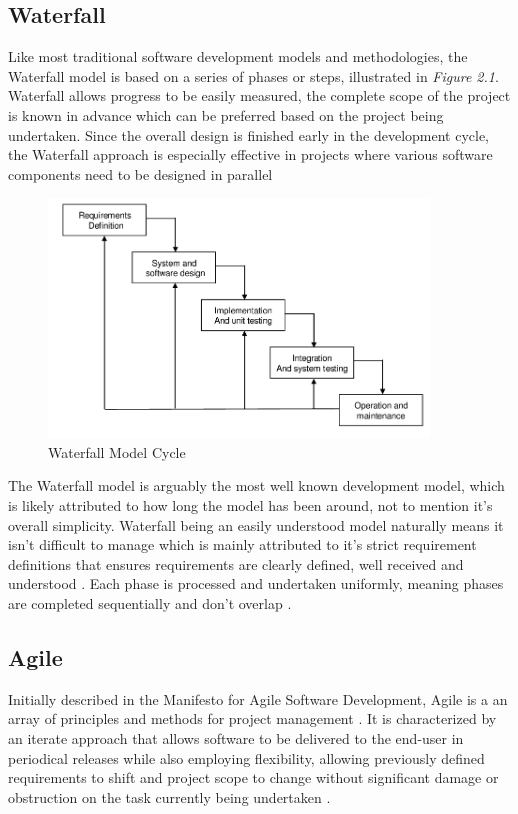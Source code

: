 \subsection{Waterfall}
Like most traditional software development models and methodologies, the Waterfall model is based on a series of phases or steps, illustrated in \textit{Figure 2.1}. Waterfall allows progress to be easily measured, the complete scope of the project is known in advance which can be preferred based on the project being undertaken. Since the overall design is finished early in the development cycle, the Waterfall approach is especially effective in projects where various software components need to be designed in parallel \cite{WATERFALL_SURVEY} 

\begin{figure}[H]
	\caption{Waterfall Model Cycle}
	\label{image:waterfall}
	\centering
	\includegraphics[width=0.9\textwidth]{images/waterfall.png}
\end{figure}	

The Waterfall model is arguably the most well known development model, which is likely attributed to how long the model has been around, not to mention it's overall simplicity. Waterfall being an easily understood model naturally means it isn't difficult to manage which is mainly attributed to it's strict requirement definitions that ensures requirements are clearly defined, well received and understood \cite{WATERFALL}. Each phase is processed and undertaken uniformly, meaning phases are completed sequentially and don't overlap \cite{WATERFALL_REVIEW}.

\subsection{Agile}
Initially described in the Manifesto for Agile Software Development, Agile is a an array of principles and methods for project management \cite{AGILE_MANIFESTO}. It is characterized by an iterate approach that allows software to be delivered to the end-user in periodical releases while also employing flexibility, allowing previously defined requirements to shift and project scope to change without significant damage or obstruction on the task currently being undertaken \cite{AGILE}.

